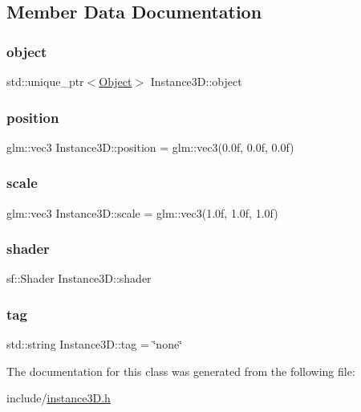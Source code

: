 \subsection{Member Data Documentation}
\mbox{\label{classInstance3D_af66fce2a9f2854259755505443683056}} 
\subsubsection{\texorpdfstring{object}{object}}
{\footnotesize\ttfamily std\+::unique\+\_\+ptr$<$\hyperlink{classObject}{Object}$>$ Instance3\+D\+::object}

\mbox{\label{classInstance3D_adf6e68d08e5a058e1a1b90e2a0eb435b}} 
\subsubsection{\texorpdfstring{position}{position}}
{\footnotesize\ttfamily glm\+::vec3 Instance3\+D\+::position = glm\+::vec3(0.\+0f, 0.\+0f, 0.\+0f)}

\mbox{\label{classInstance3D_a08b79effaa2e84123c6f768c4a88ae27}} 
\subsubsection{\texorpdfstring{scale}{scale}}
{\footnotesize\ttfamily glm\+::vec3 Instance3\+D\+::scale = glm\+::vec3(1.\+0f, 1.\+0f, 1.\+0f)}

\mbox{\label{classInstance3D_abad4211b399d2be03ffa2ea82ad50d5a}} 
\subsubsection{\texorpdfstring{shader}{shader}}
{\footnotesize\ttfamily sf\+::\+Shader Instance3\+D\+::shader}

\mbox{\label{classInstance3D_a93818416ceca4cf47a128fa08c329353}} 
\subsubsection{\texorpdfstring{tag}{tag}}
{\footnotesize\ttfamily std\+::string Instance3\+D\+::tag = \char`\"{}none\char`\"{}}



The documentation for this class was generated from the following file\+:\begin{DoxyCompactItemize}
\item 
include/\hyperlink{instance3D_8h}{instance3\+D.\+h}\end{DoxyCompactItemize}
